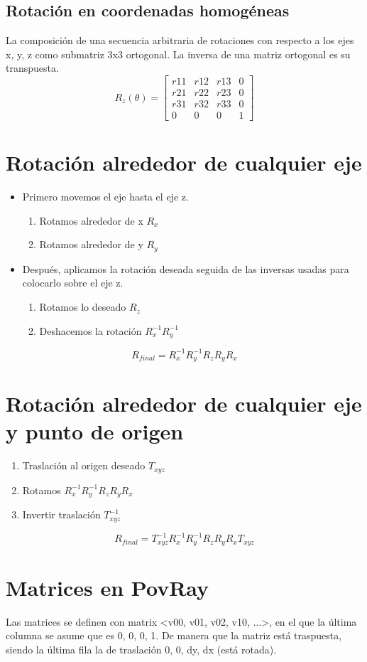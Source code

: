 \subsection{Rotación en coordenadas homogéneas}
La composición de una secuencia arbitraria de rotaciones con respecto a los ejes x, y, z como submatriz 3x3 ortogonal. La inversa de una matriz ortogonal es su transpuesta.
$$R_z(\theta)=\left[\begin{matrix}
r11 & r12 & r13 & 0 \\ 
r21 & r22 & r23 & 0 \\ 
r31 & r32 & r33 & 0 \\
0 & 0 & 0 & 1
\end{matrix}\right]$$
\pagebreak

\section{Rotación alrededor de cualquier eje}
\begin{itemize}
    \item Primero movemos el eje hasta el eje z.
    \begin{enumerate}
        \item Rotamos alrededor de x $R_x$
        \item Rotamos alrededor de y $R_y$
    \end{enumerate}
    \item Después, aplicamos la rotación deseada seguida de las inversas usadas para colocarlo sobre el eje z.
    \begin{enumerate}
        \item Rotamos lo deseado $R_z$
        \item Deshacemos la rotación $R_x^{-1}R_y^{-1}$
    \end{enumerate}
\end{itemize}
$$R_{final}=R_x^{-1}R_y^{-1}R_zR_yR_x$$

\section{Rotación alrededor de cualquier eje y punto de origen}
\begin{enumerate}
    \item Traslación al origen deseado $T_{xyz}$
    \item Rotamos $R_x^{-1}R_y^{-1}R_zR_yR_x$
    \item Invertir traslación $T_{xyz}^{-1}$
\end{enumerate}
$$R_{final}=T_{xyz}^{-1}R_x^{-1}R_y^{-1}R_zR_yR_xT_{xyz}$$

\section{Matrices en PovRay}
Las matrices se definen con matrix <v00, v01, v02, v10, ...>, en el que la última columna se asume que es 0, 0, 0, 1. De manera que la matriz está traspuesta, siendo la última fila la de traslación 0, 0, dy, dx (está rotada).